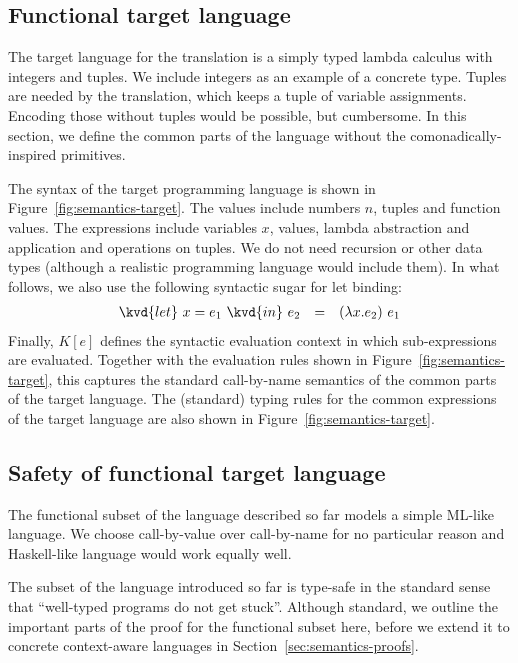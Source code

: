 \subsection{Functional target language}
\label{sec:semantics-translation-target}

The target language for the translation is a simply typed lambda calculus with integers and tuples.
We include integers as an example of a concrete type. Tuples are needed by the translation, which
keeps a tuple of variable assignments. Encoding those without tuples would be possible, but
cumbersome. In this section, we define the common parts of the language without the
comonadically-inspired primitives.

The syntax of the target programming language is shown in Figure~\ref{fig:semantics-target}.
The values include numbers $n$, tuples and function values. The expressions include variables $x$,
values, lambda abstraction and application and operations on tuples. We do not need recursion or
other data types (although a realistic programming language would include them).
In what follows, we also use the following syntactic sugar for let binding:
%
\begin{equation*}
\begin{array}{rcl}
  \kvd{let}~x=e_1~\kvd{in}~e_2 &=& (\lambda x.e_2)~e_1
\end{array}
\end{equation*}
%
Finally, $K[e]$ defines the syntactic evaluation context in which sub-expressions are evaluated.
Together with the evaluation rules shown in  Figure~\ref{fig:semantics-target}, this captures the
standard call-by-name semantics of the common parts of the target language. The (standard) typing rules
for the common expressions of the target language are also shown in Figure~\ref{fig:semantics-target}.


\subsection{Safety of functional target language}

The functional subset of the language described so far models a simple ML-like language. We
choose call-by-value over call-by-name for no particular reason and Haskell-like language would
work equally well.

The subset of the language introduced so far is type-safe in the standard sense that
``well-typed programs do not get stuck''. Although standard, we outline the important parts
of the proof for the functional subset here, before we extend it to concrete context-aware
languages in Section~\ref{sec:semantics-proofs}.

